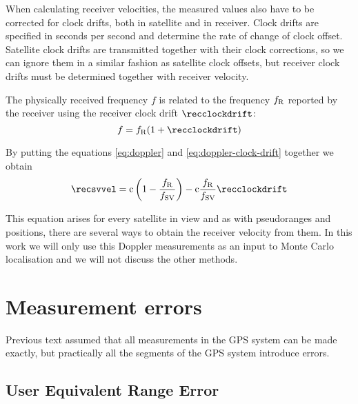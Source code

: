 When calculating receiver velocities, the measured values also have to be corrected for
clock drifts, both in satellite and in receiver.
Clock drifts are specified in seconds per second and determine the rate of change of clock offset.
Satellite clock drifts are transmitted together with their clock corrections, so we can ignore
them in a similar fashion as satellite clock offsets, but receiver clock drifts must be determined
together with receiver velocity.

The physically received frequency \(f\) is related to the frequency \(f_{\mathrm{R}}\) reported by the receiver
using the receiver clock drift \(\recclockdrift\):
\begin{equation}
	f = f_\REC ( 1 + \recclockdrift)
	\label{eq:doppler-clock-drift}
\end{equation}

By putting the equations \eqref{eq:doppler} and \eqref{eq:doppler-clock-drift}
together we obtain
\begin{equation}
	\recsvvel
	=
	\speedoflight \left(1 - \frac{f_\REC}{f_\SV}\right) -
	\speedoflight \frac{f_\REC}{f_\SV} \recclockdrift
\end{equation}

This equation arises for every satellite in view and
as with pseudoranges and positions, there are several ways to obtain the receiver velocity
from them.
In this work we will only use this Doppler measurements as an input to Monte Carlo localisation
and we will not discuss the other methods.

\section{Measurement errors}
\label{sec:gps-errors}

Previous text assumed that all measurements in the GPS system can be made exactly,
but practically all the segments of the GPS system introduce errors.

\subsection{User Equivalent Range Error}
\label{sec:gps-uere}


